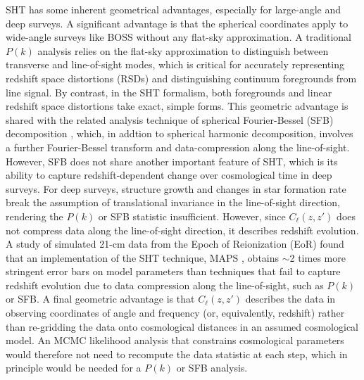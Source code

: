 \documentclass[fleqn,usenatbib]{mnras}
\begin{document}
SHT has some inherent geometrical advantages, especially for large-angle and deep surveys. A significant advantage is that the spherical coordinates apply to wide-angle surveys like BOSS without any flat-sky approximation. A traditional $P(k)$ analysis relies on the flat-sky approximation to distinguish between transverse and line-of-sight modes, which is critical for accurately representing redshift space distortions (RSDs) and distinguishing continuum foregrounds from line signal. By contrast, in the SHT formalism, both foregrounds and linear redshift space distortions take exact, simple forms. This geometric advantage is shared with the related analysis technique of spherical Fourier-Bessel (SFB) decomposition \citep{1995MNRAS.272..885F, 1995MNRAS.275..483H, 2012A&A...540A.115R, 2012A&A...540A..60L, 2013PhRvD..88b3502Y,
2015A&A...578A..10L,
2016ApJ...833..242L, PhysRevD.104.123548}, which, in addtion to spherical harmonic decomposition, involves a further Fourier-Bessel transform and data-compression along the line-of-sight. However, SFB does not share another important feature of SHT, which is its ability to capture redshift-dependent change over cosmological time in deep surveys. 
For deep surveys, structure growth and changes in star formation rate break the assumption of translational invariance in the line-of-sight direction, rendering the $P(k)$ or SFB statistic insufficient. However, since $C_{\ell}(z,z')$ does not compress data along the line-of-sight direction, it describes redshift evolution. A study \citep{2022arXiv220311095M} of simulated 21-cm data from the Epoch of Reionization (EoR) found that an implementation of the SHT technique, MAPS \citep{2018MNRAS.474.1390M, 2019MNRAS.483L.109M, 2020MNRAS.494.4043M},  obtains $\sim$2 times more stringent error bars on model parameters than techniques that fail to capture redshift evolution due to data compression along the line-of-sight, such as $P(k)$ or SFB. A final geometric advantage is that $C_{\ell}(z,z')$ describes the data in observing coordinates of angle and frequency (or, equivalently, redshift) rather than re-gridding the data onto cosmological distances in an assumed cosmological model. An MCMC likelihood analysis that constrains cosmological parameters would therefore not need to recompute the data statistic at each step, which in principle would be needed for a $P(k)$ or SFB analysis.
\end{document}
